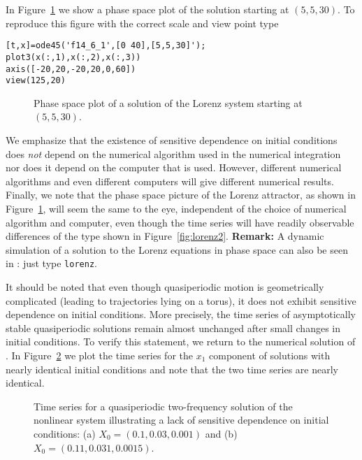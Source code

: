 \documentclass{ximera}
\begin{document}
In Figure~\ref{fig:lorenz3} we show a phase space plot of the
solution starting at $(5,5,30)$.  To reproduce this figure with the 
correct scale and view point type
\begin{verbatim}
[t,x]=ode45('f14_6_1',[0 40],[5,5,30]');
plot3(x(:,1),x(:,2),x(:,3))
axis([-20,20,-20,20,0,60])
view(125,20)
\end{verbatim}
\begin{figure}[htb]
   \centerline{%
   }
   \caption{Phase space plot of a solution of the Lorenz system
   starting at $(5,5,30)$.}
   \label{fig:lorenz3}
\end{figure}

We emphasize that the existence of sensitive dependence on initial conditions 
does {\em not\/} depend on the numerical algorithm used in the numerical 
integration nor does it depend on the computer that is used.  However, 
different numerical algorithms and even different computers will give 
different numerical results.   Finally, we note that the phase space picture 
of the Lorenz attractor, as shown in 
Figure~\ref{fig:lorenz3}, will seem the same to the eye, independent of the 
choice of numerical algorithm and computer,
even though the time series will have readily observable differences of the
type shown in Figure~\ref{fig:lorenz2}.  {\bf Remark:}  A dynamic simulation 
of a solution to the Lorenz equations in phase space can also be seen in 
\Matlabp: just type {\tt lorenz}.

It should be noted that even though quasiperiodic motion is geometrically 
complicated (leading to trajectories lying on a torus), it does not exhibit
sensitive dependence on initial conditions.  More precisely, the time series 
of asymptotically stable quasiperiodic solutions remain almost unchanged 
after small changes in initial conditions.  To verify this statement, we 
return to the numerical solution of .  In Figure~\ref{F:tor3tsab}
we plot the time series for the $x_1$ component of solutions with nearly 
identical initial conditions and note that the two time series are nearly 
identical.

\begin{figure}[htb]
   \centerline{%
   }
   \caption{Time series for a quasiperiodic two-frequency solution of the 
	nonlinear system \protect{} illustrating a lack of sensitive 
	dependence on initial conditions: (a) $X_0=(0.1,0.03,0.001)$ and (b) 
	$X_0=(0.11,0.031,0.0015)$.}
   \label{F:tor3tsab}
\end{figure}
\end{document}
